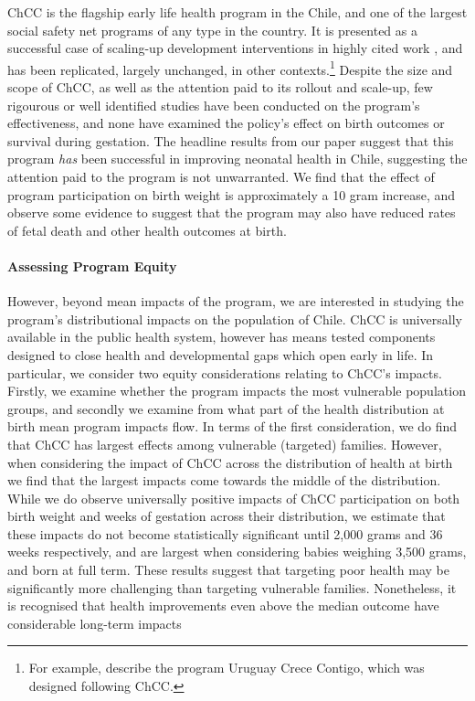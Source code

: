 \documentclass[12pt]{article}
\begin{document}
\begin{spacing}{1.4}
ChCC is the flagship early life health program in the Chile, and one of
the largest social safety net programs of any type in the country.  It is
presented as a successful case of scaling-up development interventions in
highly cited work
\citep{Richteretal2017}, and has been replicated, largely unchanged, in
other contexts.\footnote{For example, \citet{Marroigetal2017} describe the
  program Uruguay Crece Contigo, which was designed following ChCC.} Despite
the size and scope of ChCC, as well as the attention paid to its rollout and
scale-up, few rigourous or well identified studies have been
conducted on the program's effectiveness, and none %
have examined the policy's effect on birth outcomes or survival during
gestation. The headline results from our paper suggest that this program
\emph{has} been successful in improving neonatal health in Chile, suggesting
the attention paid to the program is not unwarranted.  We find
that the effect of program participation on birth weight is approximately a
10 gram increase, and observe some evidence to suggest that the program
may also have reduced rates of fetal death and other health outcomes at
birth.

\paragraph{Assessing Program Equity}
However, beyond mean impacts of the program, we are interested in studying
the program's distributional impacts on the population of Chile.  ChCC
is universally available in the public health system, however has means
tested components designed to close health and developmental gaps which
open early in life. In particular, we consider two equity considerations
relating to ChCC's impacts.  Firstly, we examine whether the program
impacts the most vulnerable population groups, and secondly we examine
from what part of the health distribution at birth mean program impacts
flow.  In terms of the first consideration, we do find that ChCC has
largest effects among vulnerable (targeted) families.  However, when
considering the impact of ChCC across the distribution of health at birth
we find that the largest impacts come towards the middle of the distribution.
While we do observe universally positive impacts of ChCC participation on
both birth weight and weeks of gestation across their distribution, we
estimate that these impacts do not become
statistically significant until 2,000 grams and 36 weeks respectively, and
are largest when considering babies weighing 3,500 grams, and born at full
term.  These results suggest that targeting poor health may be significantly
more challenging than targeting vulnerable families.  Nonetheless, it is
recognised that health improvements even above the median outcome have
considerable long-term impacts \citep{Royer2009}


\end{spacing}
\end{document}
